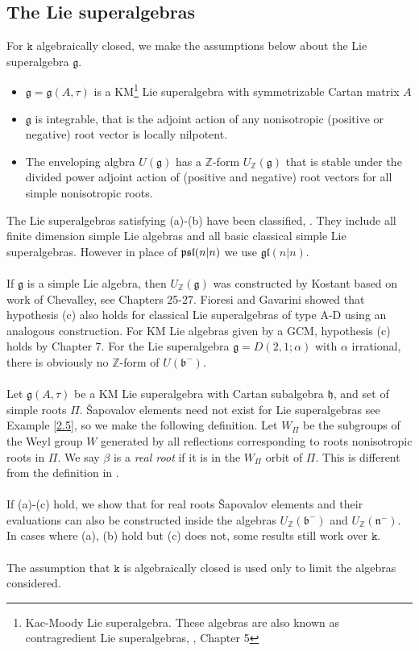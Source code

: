 \documentclass{article}
\def\Z{{\mathbb Z}}
\newcommand{\ttk}{\mathtt{k}}
\newcommand{\itema}{\item[{{\rm(a)}}]}
\newcommand{\itemb}{\item[{{\rm(b)}}]}
\newcommand{\itemc}{\item[{{\rm(c)}}]}
\newcommand{\ga}{\alpha}
\newcommand{\gb}{\beta}
\newcommand{\gt}{\tau}
\newcommand{\fg}{\mathfrak{g}}\newcommand{\fgl}{\mathfrak{gl}}\newcommand{\so}{\mathfrak{so}}
\newcommand{\fh}{\mathfrak{h}}
\newcommand{\fb}{\mathfrak{b}}
\newcommand{\fn}{\mathfrak{n}}
\newcommand{\ff}{\footnote}
\newcommand{\bi}{\begin{itemize}}
\newcommand{\ei}{\end{itemize}}
\begin{document}
\subsection{The Lie superalgebras} \label{gsi}For $\ttk$  algebraically closed, we make the assumptions below about the Lie superalgebra  $\fg$.
\bi
\itema  $\fg=\fg(A,\gt)$ %
\index{KM Lie superalgebra $\fg(A,\gt)$} is a KM\ff{Kac-Moody Lie superalgebra. These algebras are also known as contragredient Lie superalgebras, \cite{Kac1}, \cite{M101}  Chapter 5} Lie superalgebra with symmetrizable Cartan matrix $A$
\itemb $\fg$ is integrable, that is
the adjoint action of any nonisotropic (positive or negative) root vector is locally nilpotent.
\itemc The enveloping algbra $U(\fg)$ \index{Integral forms!$U_\Z(\fg)$} has a $\Z$-form $U_\Z(\fg)$ that is stable under the divided power adjoint action of (positive and negative) root vectors for all simple nonisotropic roots.
\ei The  
Lie superalgebras satisfying (a)-(b) have been classified, \cite{S1}. They include all finite dimension simple Lie algebras and all basic classical simple Lie superalgebras.  However in place of $\mathfrak{psl}(n|n)$ we use $\fgl(n|n)$.
\\ \\
If $\fg$
 is a simple Lie algebra, then $U_\Z(\fg)$ was constructed by Kostant based on work of Chevalley, see \cite{H}   Chapters 25-27. Fioresi and Gavarini \cite{FG} showed that hypothesis (c) also holds for classical Lie superalgebras of type A-D using an analogous construction. 
For KM Lie algebras given by a GCM, hypothesis (c) holds by \cite{Mq} Chapter 7. 
 For the Lie superalgebra $\fg=D(2,1;\ga)$ with $\ga$ irrational, there is obviously no $\Z$-form of $U(\fb^-)$.
\\ \\
Let 
 $\fg(A,\gt)$ be a KM Lie superalgebra with Cartan subalgebra $\fh$, and set of simple roots $\Pi$.
\v Sapovalov elements need not exist for Lie superalgebras see Example \ref{2.5}, so we make the following definition. Let $W_\Pi$ be the subgroups of the Weyl group $W$ generated by all reflections corresponding to roots 
nonisotropic roots in $\Pi$. We say $\gb$ is a {\it real root} if it is in the $W_\Pi$ orbit of $\Pi$. This is different from the definition in \cite{S1}.\\ \\
If  (a)-(c) hold, we show that for real roots \v Sapovalov elements and their evaluations can also be constructed inside   the algebras $U_\Z(\fb^-)$ and $U_\Z(\fn^-)$.  In cases where (a), (b) hold but (c) does not, some results still work over $\ttk$. 
\\ \\ The assumption that $\ttk$ is algebraically closed is used only to limit the algebras considered. %
\end{document}
